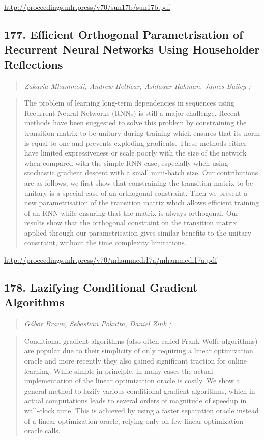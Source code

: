 \documentclass{article}
\begin{document}
\href{http://proceedings.mlr.press/v70/sun17b/sun17b.pdf}{http://proceedings.mlr.press/v70/sun17b/sun17b.pdf}

\subsection{177. Efficient Orthogonal Parametrisation of Recurrent Neural Networks Using Householder Reflections}

\begin{quote}
\footnotesize{\textit{Zakaria Mhammedi, Andrew Hellicar, Ashfaqur Rahman, James Bailey ;}}
\end{quote}

\begin{quote}
    The problem of learning long-term dependencies in sequences using Recurrent Neural Networks (RNNs) is still a major challenge. Recent methods have been suggested to solve this problem by constraining the transition matrix to be unitary during training which ensures that its norm is equal to one and prevents exploding gradients. These methods either have limited expressiveness or scale poorly with the size of the network when compared with the simple RNN case, especially when using stochastic gradient descent with a small mini-batch size. Our contributions are as follows; we first show that constraining the transition matrix to be unitary is a special case of an orthogonal constraint. Then we present a new parametrisation of the transition matrix which allows efficient training of an RNN while ensuring that the matrix is always orthogonal. Our results show that the orthogonal constraint on the transition matrix applied through our parametrisation gives similar benefits to the unitary constraint, without the time complexity limitations.  \end{quote}

\href{http://proceedings.mlr.press/v70/mhammedi17a/mhammedi17a.pdf}{http://proceedings.mlr.press/v70/mhammedi17a/mhammedi17a.pdf}

\subsection{178. Lazifying Conditional Gradient Algorithms}

\begin{quote}
\footnotesize{\textit{Gábor Braun, Sebastian Pokutta, Daniel Zink ;}}
\end{quote}

\begin{quote}
    Conditional gradient algorithms (also often called Frank-Wolfe algorithms) are popular due to their simplicity of only requiring a linear optimization oracle and more recently they also gained significant traction for online learning. While simple in principle, in many cases the actual implementation of the linear optimization oracle is costly. We show a general method to lazify various conditional gradient algorithms, which in actual computations leads to several orders of magnitude of speedup in wall-clock time. This is achieved by using a faster separation oracle instead of a linear optimization oracle, relying only on few linear optimization oracle calls.  \end{quote}
\end{document}

